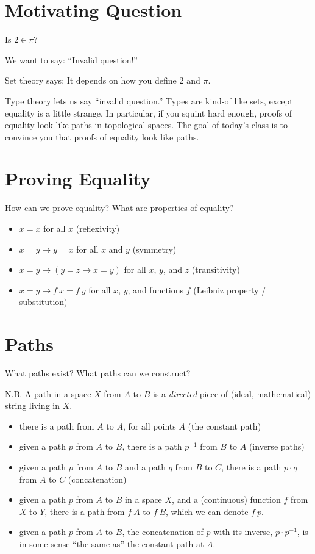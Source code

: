 \documentclass{article}
\theoremstyle{definition}
\begin{document}
\section{Motivating Question}
  Is $2 \in \pi$?
  
  We want to say: ``Invalid question!''
  
  Set theory says: It depends on how you define $2$ and $\pi$.
  
  Type theory lets us say ``invalid question.''  Types are kind-of like sets, except equality is a little strange.  In particular, if you squint hard enough, proofs of equality look like paths in topological spaces.  The goal of today's class is to convince you that proofs of equality look like paths.

\section{Proving Equality}
How can we prove equality?  What are properties of equality?
\begin{itemize}
  \item $x = x$ for all $x$ (reflexivity)
  \item $x = y \to y = x$ for all $x$ and $y$ (symmetry)
  \item $x = y \to (y = z \to x = y)$ for all $x$, $y$, and $z$ (transitivity)
  \item $x = y \to f~x = f~y$ for all $x$, $y$, and functions $f$ (Leibniz property / substitution)
\end{itemize}

\section{Paths}
What paths exist?  What paths can we construct?

N.B. A path in a space $X$ from $A$ to $B$ is a \emph{directed} piece of (ideal, mathematical) string living in $X$.
\begin{itemize}
  \item there is a path from $A$ to $A$, for all points $A$ (the constant path)
  \item given a path $p$ from $A$ to $B$, there is a path $p^{-1}$ from $B$ to $A$ (inverse paths)
  \item given a path $p$ from $A$ to $B$ and a path $q$ from $B$ to $C$, there is a path $p \cdot q$ from $A$ to $C$ (concatenation)
  \item given a path $p$ from $A$ to $B$ in a space $X$, and a (continuous) function $f$ from $X$ to $Y$, there is a path from $f~A$ to $f~B$, which we can denote $f~p$.
  \item given a path $p$ from $A$ to $B$, the concatenation of $p$ with its inverse, $p \cdot p^{-1}$, is in some sense ``the same as'' the constant path at $A$.
\end{itemize}
\end{document}
